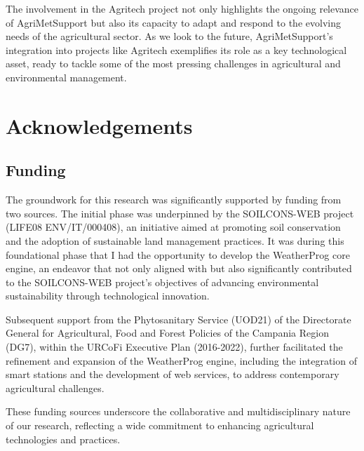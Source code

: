 \documentclass[authoryear,preprint,review,12pt]{elsarticle}
\begin{document}
The involvement in the Agritech project not only highlights the ongoing relevance of AgriMetSupport but also its capacity to adapt and respond to the evolving needs of the agricultural sector. 
As we look to the future, AgriMetSupport's integration into projects like Agritech exemplifies its role as a key technological asset, ready to tackle some of the most pressing challenges in agricultural and environmental management.

\section*{Acknowledgements}
\subsection*{Funding}
The groundwork for this research was significantly supported by funding from two sources. 
The initial phase was underpinned by the SOILCONS-WEB project (LIFE08 ENV/IT/000408), an initiative aimed at promoting soil conservation and the adoption of sustainable land management practices. 
It was during this foundational phase that I had the opportunity to develop the WeatherProg core engine, an endeavor that not only aligned with but also significantly contributed to the SOILCONS-WEB project's objectives of advancing environmental sustainability through technological innovation.

Subsequent support from the Phytosanitary Service (UOD21) of the Directorate General for Agricultural, Food and Forest Policies of the Campania Region (DG7), within the URCoFi Executive Plan (2016-2022), further facilitated the refinement and expansion of the WeatherProg engine, including the integration of smart stations and the development of web services, to address contemporary agricultural challenges.

These funding sources underscore the collaborative and multidisciplinary nature of our research, reflecting a wide commitment to enhancing agricultural technologies and practices.%



\end{document}
